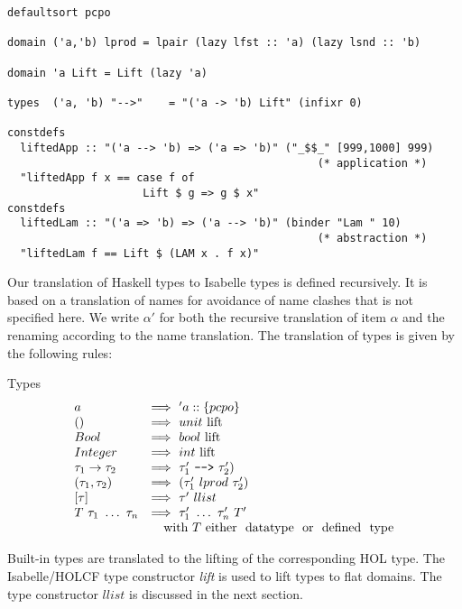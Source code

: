 \documentclass{llncs}
\begin{document}
\begin{verbatim} 
defaultsort pcpo

domain ('a,'b) lprod = lpair (lazy lfst :: 'a) (lazy lsnd :: 'b)

domain 'a Lift = Lift (lazy 'a)

types  ('a, 'b) "-->"    = "('a -> 'b) Lift" (infixr 0)

constdefs
  liftedApp :: "('a --> 'b) => ('a => 'b)" ("_$$_" [999,1000] 999)
                                                (* application *)
  "liftedApp f x == case f of
                     Lift $ g => g $ x"
constdefs
  liftedLam :: "('a => 'b) => ('a --> 'b)" (binder "Lam " 10)
                                                (* abstraction *)
  "liftedLam f == Lift $ (LAM x . f x)"
\end{verbatim}

Our translation of Haskell types to Isabelle types is defined
recursively.  It is based on a translation of names for avoidance of
name clashes that is not specified here. We write $\alpha'$ for both
the recursive translation of item $\alpha$ and the renaming according
to the name translation.  The translation of types is given by the
following rules:


\noindent Types
$$\begin{array}{ll}
  a & \Longrightarrow \ 'a::\{pcpo\} \\
  () & \Longrightarrow \ unit \ \mbox{lift} \\
  Bool & \Longrightarrow \ bool \ \mbox{lift} \\
  Integer & \Longrightarrow \ int \ \mbox{lift} \\
  \tau_{1} \to \tau_{2} & \Longrightarrow
  \ \tau'_{1} \ \verb@-->@ \ \tau'_{2})  \\
  (\tau_{1},\tau_{2}) & \Longrightarrow
  \ (\tau'_{1} ~lprod~ \tau'_{2}) \\
  {[\tau]} \ & \Longrightarrow \ \tau' \ llist \\
  T \ \tau_1 \ \ldots \ \tau_n & \Longrightarrow
  \ \tau'_1 \ \ldots \ \tau'_n \ T' \\
  & \quad \mbox{with} \ T \ \mbox{either \ datatype \ or \ defined \ type} \\
\end{array}$$

Built-in types are translated to the lifting of the corresponding HOL type.
The Isabelle/HOLCF type constructor \emph{lift} is used to lift types to flat
domains. The type constructor $llist$ is discussed in the next section.
\end{document}
